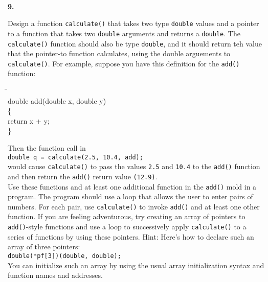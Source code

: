 \documentclass[10 pt]{amsart}
\newlength{\cwidth}
\newenvironment{cpart}[2][\cwidth]
	{\\ \phantom{\qquad}\textbf{#2. }\begin{minipage}[t]{#1}}
	{\end{minipage}}
\newcommand{\ttt}[1]{\texttt{#1}}
\begin{document}
	\begin{cpart}{9}
		Design a function \ttt{calculate()} that takes two type
		\ttt{double} values and a pointer to a function that takes
		two \ttt{double} arguments and returns a \ttt{double}.
		The \ttt{calculate()} function should also be type \ttt{double}, 
		and it should return teh value that the pointer-to function
		calculates, using the double arguements to \ttt{calculate()}.
		For example, suppose you have this definition for the 
		\ttt{add()} function:
		{\ttfamily
			\begin{tabbing}
				\phantom{\qquad}\=\phantom{\qquad}\=\phantom{\qquad}\= \\
				double add(double x, double y) \\
				\{ \\
				\> return x + y; \\
				\}
			\end{tabbing}
		}		
		Then the function call in \\[2ex]
		\ttt{double q = calculate(2.5, 10.4, add);} \\[2ex]
		would cause \ttt{calculate()} to pass the values
		\ttt{2.5} and \ttt{10.4} to the \ttt{add()} function
		and then return the \ttt{add()} return value \ttt{(12.9)}. \\[2ex]
		Use these functions and at least one additional function in the 
		\ttt{add()} mold in a program.
		The program should use a loop that allows the user to enter
		pairs of numbers.
		For each pair, use \ttt{calculate()} to invoke \ttt{add()}
		and at least one other function.
		If you are feeling adventurous, try creating an array of pointers
		to \ttt{add()}-style functions and use a loop to
		successively apply \ttt{calculate()} to a series of functions
		by using these pointers.
		Hint: Here's how to declare such an array of three pointers: \\[2ex]
		\ttt{double(*pf[3])(double, double);} \\[2ex]
		You can initialize such an array by using the usual array
		initialization syntax and function names and addresses.
	\end{cpart}
	\vspace{2ex}
\end{document}
